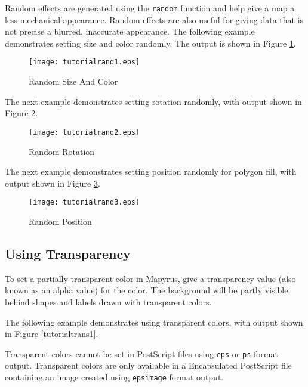 Random effects are generated using the \texttt{random}
function and help give a map a less mechanical appearance.
Random effects are also useful for giving data that is not
precise a blurred, inaccurate appearance.
The following example demonstrates setting size and color randomly.
The output is shown in Figure \ref{tutorialrand1}.



\begin{figure}[htb]
\texttt{[image: tutorialrand1.eps]}
\caption{Random Size And Color}
\label{tutorialrand1}
\end{figure}

The next example demonstrates setting rotation randomly, with output shown in
Figure \ref{tutorialrand2}.



\begin{figure}[htb]
\texttt{[image: tutorialrand2.eps]}
\caption{Random Rotation}
\label{tutorialrand2}
\end{figure}

The next example demonstrates setting position randomly for polygon fill, with
output shown in Figure \ref{tutorialrand3}.



\begin{figure}[htb]
\texttt{[image: tutorialrand3.eps]}
\caption{Random Position}
\label{tutorialrand3}
\end{figure}

\subsection{Using Transparency}

To set a partially transparent color in Mapyrus, give a
transparency value (also known as an alpha value) for the color.
The background will be partly visible behind shapes and labels
drawn with transparent colors.

The following example demonstrates using transparent colors, with
output shown in Figure \ref{tutorialtrans1}.

Transparent colors cannot be set in PostScript files using
\texttt{eps} or \texttt{ps}
format output.
Transparent colors are only available in a Encapsulated PostScript file
containing an image created using
\texttt{epsimage}
format output.



